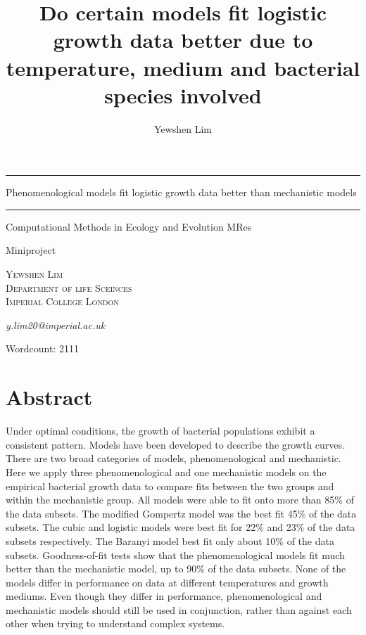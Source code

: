 \documentclass[11pt, a4paper, titlepage]{article}
\title{Do certain models fit logistic growth data better due to temperature, 
medium and bacterial species involved}
\author{Yewshen Lim}
\begin{document}
\begin{titlepage}
    
    \centering

    \scshape

    \vspace*{\baselineskip}

    \rule{\textwidth}{1.6pt}\vspace*{-\baselineskip}\vspace*{2pt}

    \vspace{0.75\baselineskip}

    {\LARGE Phenomenological models fit logistic growth data better than mechanistic models}

    \rule{\textwidth}{1.6pt}

    \vspace{2\baselineskip}

    Computational Methods in Ecology and Evolution MRes
    \vspace{0.5\baselineskip}
    
    Miniproject

    \vspace*{3\baselineskip}

    {\scshape\Large Yewshen Lim\\
		Department of life Sceinces \\
		Imperial College London\\}
	
    \textit{y.lim20@imperial.ac.uk}
    
    Wordcount: 2111
	
    \vspace*{3\baselineskip}

\end{titlepage}

\section*{Abstract}

Under optimal conditions, the growth of bacterial populations exhibit a consistent pattern. Models have been developed to describe the growth curves. There are two broad categories of models, phenomenological and mechanistic. Here we apply three phenomenological and one mechanistic models on the empirical bacterial growth data to compare fits between the two groups and within the mechanistic group. All models were able to fit onto more than 85\% of the data subsets. The modified Gompertz model was the best fit 45\% of the data subsets. The cubic and logistic models were best fit for 22\% and 23\% of the data subsets respectively. The Baranyi model best fit only about 10\% of the data subsets. Goodness-of-fit tests show that the phenomenological models fit much better than the mechanistic model, up to 90\% of the data subsets. None of the models differ in performance on data at different temperatures and growth mediums. Even though they differ in performance, phenomenological and mechanistic models should still be used in conjunction, rather than against each other when trying to understand complex systems.
\end{document}
